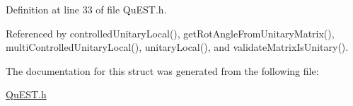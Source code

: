 Definition at line 33 of file Qu\+E\+S\+T.\+h.



Referenced by controlled\+Unitary\+Local(), get\+Rot\+Angle\+From\+Unitary\+Matrix(), multi\+Controlled\+Unitary\+Local(), unitary\+Local(), and validate\+Matrix\+Is\+Unitary().



The documentation for this struct was generated from the following file\+:\begin{DoxyCompactItemize}
\item 
\mbox{\hyperlink{QuEST_8h}{Qu\+E\+S\+T.\+h}}\end{DoxyCompactItemize}
